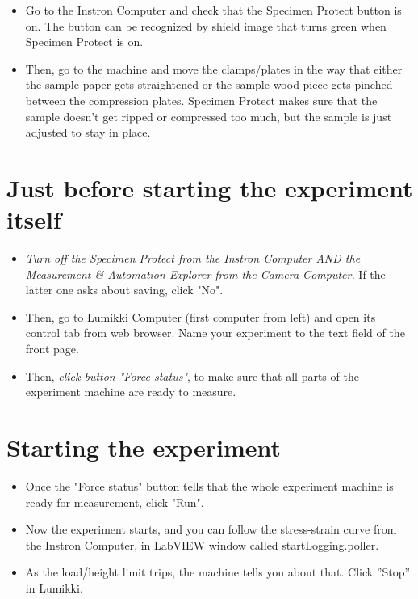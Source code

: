 \documentclass[a4paper]{article}
\begin{document}
\begin{itemize}
  \item Go to the Instron Computer and check that the Specimen Protect button is on. The button can be recognized by shield image that turns green when Specimen Protect is on.
  \item Then, go to the machine and move the clamps/plates in the way that either the sample paper gets straightened or the sample wood piece gets pinched between the compression plates. Specimen Protect makes sure that the sample doesn't get ripped or compressed too much, but the sample is just adjusted to stay in place.
\end{itemize}

\section{Just before starting the experiment itself} 

\begin{itemize}
  \item \textit{Turn off the Specimen Protect from the Instron Computer AND the Measurement \& Automation Explorer from the Camera Computer.} If the latter one asks about saving, click "No".
  \item Then, go to Lumikki Computer (first computer from left) and open its control tab from web browser. Name your experiment to the text field of the front page.
  \item Then, \textit{click button "Force status"}, to make sure that all parts of the experiment machine are ready to measure. 
\end{itemize}

\section{Starting the experiment} 

\begin{itemize}
  \item Once the "Force status" button tells that the whole experiment machine is ready for measurement, click "Run".
  \item Now the experiment starts, and you can follow the stress-strain curve from the Instron Computer, in LabVIEW  window called startLogging.poller.
  \item As the load/height limit trips, the machine tells you about that. Click ''Stop'' in Lumikki.
\end{itemize}
\end{document}
